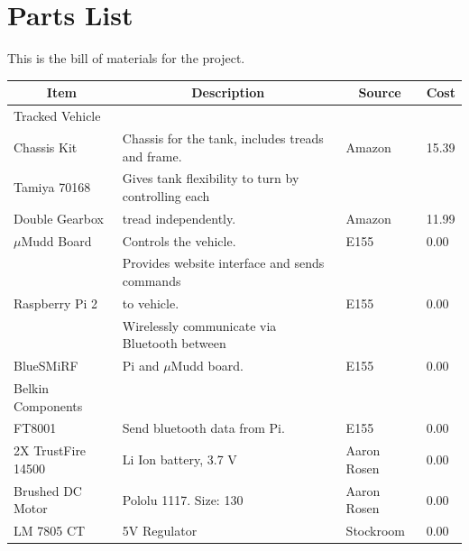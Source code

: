 \documentclass[12pt]{article}
\begin{document}
\section{Parts List}
This is the bill of materials for the project.
\begin{center}
\begin{tabular}{|l|l|l|l|}
\hline
\multicolumn{1}{|c|}{\textbf{Item}} & \multicolumn{1}{c|}{\textbf{Description}}               	& \multicolumn{1}{c|}{\textbf{Source}} & \multicolumn{1}{c|}{\textbf{Cost}} \\ \hline
Tracked Vehicle 			&										&							&	\\
			Chassis Kit	& Chassis for the tank, includes treads and frame.    	& Amazon 					& 15.39                          	\\ \hline
Tamiya 70168				& Gives tank flexibility to turn by controlling each     	& 							& \\
Double Gearbox			& tread independently.						& Amazon		               			& 11.99                             	\\ \hline
$\mu$Mudd Board                	& Controls the vehicle.                                                & E155                                 		& 0.00                               	\\ \hline
			                      	& Provides website interface and sends commands 	&							&\\
Raspberry Pi 2			    	& to vehicle.             							& E155                                 		& 0.00                               	\\ \hline
                        				& Wirelessly communicate via Bluetooth between  	&							&\\
BlueSMiRF				& Pi and $\mu$Mudd board.		 			& E155                                		& 0.00                               	\\ \hline
Belkin Components			&										&							&					\\ 
FT8001					& Send bluetooth data from Pi.					& E155                                		& 0.00                               	\\ \hline
2X TrustFire 14500			& Li Ion battery, 3.7 V 						& Aaron Rosen					& 0.00				\\ \hline
Brushed DC Motor			& Pololu 1117. Size: 130						& Aaron Rosen					& 0.00				\\ \hline
LM 7805 CT				& 5V Regulator						& Stockroom					& 0.00				\\ \hline
\end{tabular}
\end{center}
\end{document}
